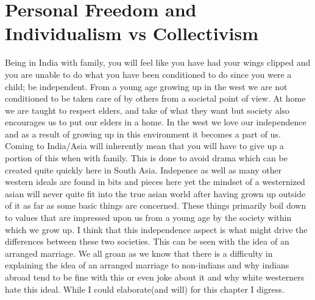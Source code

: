\chapter{Personal Freedom and Individualism vs Collectivism}
Being in India with family, you will feel like you have had your wings clipped and you are unable to do what you have been conditioned to do since you were a child; be independent. From a young age growing up in the west we are not conditioned to be taken care of by others from a societal point of view. At home we are taught to respect elders, and take of what they want but society also encourages us to put our elders in a home. In the west we love our independence and as a result of growing up in this environment it becomes a part of us. Coming to India/Asia will inherently mean that you will have to give up a portion of this when with family. This is done to avoid drama which can be created quite quickly here in South Asia. Indepence as well as many other western ideals are found in bits and pieces here yet the mindset of a westernized asian will never quite fit into the true asian world after having grown up outside of it as far as some basic things are concerned. These things primarily boil down to values that are impressed upon us from a young age by the society within which we grow up. I think that this independence aspect is what might drive the differences between these two societies. This can be seen with the idea of an arranged marriage. We all groan as we know that there is a difficulty in explaining the idea of an arranged marriage to non-indians and why indians abroad tend to be fine with this or even joke about it and why white westerners hate this ideal. While I could elaborate(and will) for this chapter I digress.

